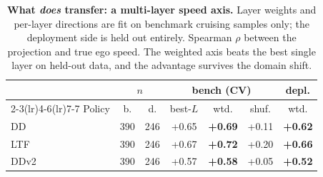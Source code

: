 \begin{table}[t]
\centering
\caption{\textbf{What \emph{does} transfer: a multi-layer speed axis.} Layer weights
and per-layer directions are fit on benchmark cruising samples only; the deployment
side is held out entirely. Spearman $\rho$ between the projection and true ego speed.
The weighted axis beats the best single layer on held-out data, and the advantage
survives the domain shift.}
\label{tab:speed}
\small
\setlength{\tabcolsep}{3.5pt}
\begin{tabular}{@{}lcccccc@{}}
\toprule
& \multicolumn{2}{c}{$n$} & \multicolumn{3}{c}{bench (CV)} & depl. \\
\cmidrule(lr){2-3}\cmidrule(lr){4-6}\cmidrule(lr){7-7}
Policy & b. & d. & best-$L$ & wtd. & shuf. & wtd. \\
\midrule
DD & 390 & 246 & +0.65 & \textbf{+0.69} & +0.11 & \textbf{+0.62} \\
LTF & 390 & 246 & +0.67 & \textbf{+0.72} & +0.20 & \textbf{+0.66} \\
DDv2 & 390 & 246 & +0.57 & \textbf{+0.58} & +0.05 & \textbf{+0.52} \\
\bottomrule
\end{tabular}
\end{table}